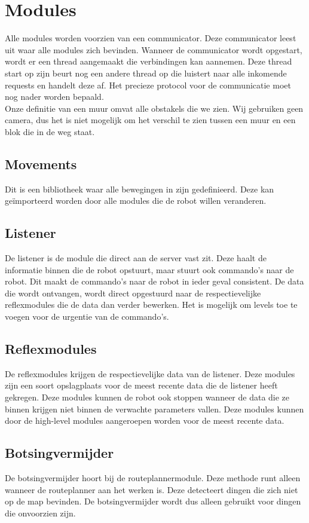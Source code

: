 \documentclass[a4paper,10pt]{article}
\begin{document}
\section{Modules}
\label{sec:modules}
Alle modules worden voorzien van een communicator. Deze communicator leest uit waar alle modules zich bevinden. Wanneer de communicator wordt opgestart, wordt er een thread aangemaakt die verbindingen kan aannemen. Deze thread start op zijn beurt nog een andere thread op die luistert naar alle inkomende requests en handelt deze af. Het precieze protocol voor de communicatie moet nog nader worden bepaald. \\
Onze definitie van een muur omvat alle obstakels die we zien. Wij gebruiken geen camera, dus het is niet mogelijk om het verschil te zien tussen een muur en een blok die in de weg staat.\\

\subsection{Movements}
Dit is een bibliotheek waar alle bewegingen in zijn gedefinieerd. Deze kan ge\"{i}mporteerd worden door alle modules die de robot willen veranderen.
\subsection{Listener}
De listener is de module die direct aan de server vast zit. Deze haalt de informatie binnen die de robot opstuurt, maar stuurt ook commando's naar de robot. Dit maakt de commando's naar de robot in ieder geval consistent. De data die wordt ontvangen, wordt direct opgestuurd naar de respectievelijke reflexmodules die de data dan verder bewerken. Het is mogelijk om levels toe te voegen voor de urgentie van de commando's.
\subsection{Reflexmodules}
De reflexmodules krijgen de respectievelijke data van de listener. Deze modules zijn een soort opslagplaats voor de meest recente data die de listener heeft gekregen. Deze modules kunnen de robot ook stoppen wanneer de data die ze binnen krijgen niet binnen de verwachte parameters vallen. Deze modules kunnen door de high-level modules aangeroepen worden voor de meest recente data.
\subsection{Botsingvermijder}
De botsingvermijder hoort bij de routeplannermodule. Deze methode runt alleen wanneer de routeplanner aan het werken is. Deze detecteert dingen die zich niet op de map bevinden. De botsingvermijder wordt dus alleen gebruikt voor dingen die onvoorzien zijn.
\end{document}

